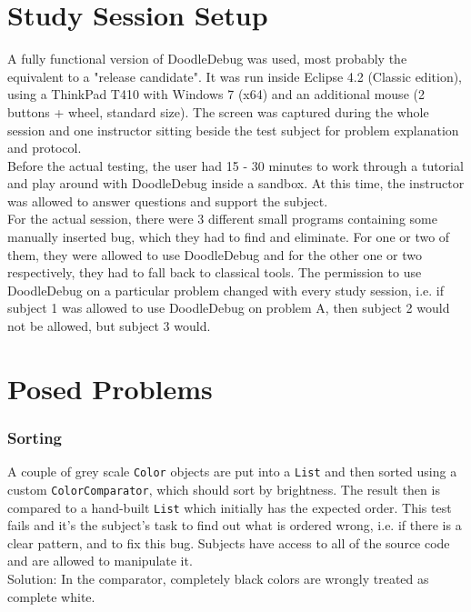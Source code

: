 \documentclass{report}
\begin{document}
\section*{Study Session Setup}
A fully functional version of DoodleDebug was used, most probably the equivalent to a "release candidate". It was run inside Eclipse 4.2 (Classic edition), using a ThinkPad T410 with Windows 7 (x64) and an additional mouse (2 buttons + wheel, standard size). The screen was captured during the whole session and one instructor sitting beside the test subject for problem explanation and protocol.\\
Before the actual testing, the user had 15 - 30 minutes to work through a tutorial and play around with DoodleDebug inside a sandbox. At this time, the instructor was allowed to answer questions and support the subject.\\
For the actual session, there were 3 different small programs containing some manually inserted bug, which they had to find and eliminate. For one or two of them, they were allowed to use DoodleDebug and for the other one or two respectively, they had to fall back to classical tools. The permission to use DoodleDebug on a particular problem changed with every study session, i.e. if subject 1 was allowed to use DoodleDebug on problem A, then subject 2 would not be allowed, but subject 3 would.

\section*{Posed Problems}
\subsubsection*{Sorting}
A couple of grey scale \verb.Color. objects are put into a \verb.List. and then sorted using a custom \verb.ColorComparator., which should sort by brightness. The result then is compared to a hand-built \verb.List. which initially has the expected order. This test fails and it's the subject's task to find out what is ordered wrong, i.e. if there is a clear pattern, and to fix this bug. Subjects have access to all of the source code and are allowed to manipulate it.\\
Solution: In the comparator, completely black colors are wrongly treated as complete white.
\end{document}
